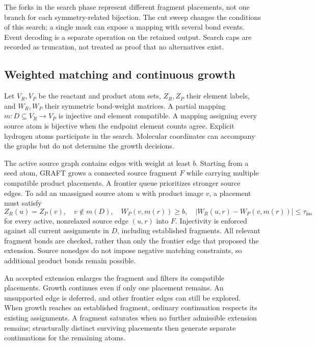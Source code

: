 The forks in the search phase represent different fragment placements, not one branch for each symmetry-related bijection. The cut sweep changes the conditions of this search; a single mask can expose a mapping with several bond events. Event decoding is a separate operation on the retained output. Search caps are recorded as truncation, not treated as proof that no alternatives exist.

\subsection{Weighted matching and continuous growth}

Let $V_R,V_P$ be the reactant and product atom sets, $Z_R,Z_P$ their element labels, and $W_R,W_P$ their symmetric bond-weight matrices. A partial mapping $m:D\subseteq V_R\rightarrow V_P$ is injective and element compatible. A mapping assigning every source atom is bijective when the endpoint element counts agree. Explicit hydrogen atoms participate in the search. Molecular coordinates can accompany the graphs but do not determine the growth decisions.

The active source graph contains edges with weight at least $b$. Starting from a seed atom, GRAFT grows a connected source fragment $F$ while carrying multiple compatible product placements. A frontier queue prioritizes stronger source edges. To add an unassigned source atom $u$ with product image $v$, a placement must satisfy
\begin{equation}
 Z_R(u)=Z_P(v),\quad v\notin m(D),\quad
 W_P(v,m(r))\geq b,\quad
 |W_R(u,r)-W_P(v,m(r))|\leq\tau_{\mathrm{iso}}
 \label{eq:match}
\end{equation}
for every active, nonrelaxed source edge $(u,r)$ into $F$. Injectivity is enforced against all current assignments in $D$, including established fragments. All relevant fragment bonds are checked, rather than only the frontier edge that proposed the extension. Source nonedges do not impose negative matching constraints, so additional product bonds remain possible.

An accepted extension enlarges the fragment and filters its compatible placements. Growth continues even if only one placement remains. An unsupported edge is deferred, and other frontier edges can still be explored. When growth reaches an established fragment, ordinary continuation respects its existing assignments. A fragment saturates when no further admissible extension remains; structurally distinct surviving placements then generate separate continuations for the remaining atoms.

